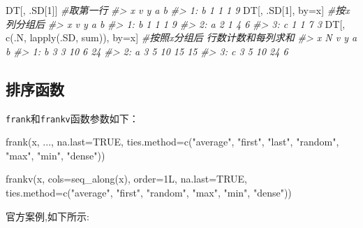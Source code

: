 \documentclass[
]{book}
\newenvironment{Shaded}{\begin{snugshade}}{\end{snugshade}}
\newcommand{\AttributeTok}[1]{\textcolor[rgb]{0.77,0.63,0.00}{#1}}
\newcommand{\CommentTok}[1]{\textcolor[rgb]{0.56,0.35,0.01}{\textit{#1}}}
\newcommand{\ConstantTok}[1]{\textcolor[rgb]{0.00,0.00,0.00}{#1}}
\newcommand{\DecValTok}[1]{\textcolor[rgb]{0.00,0.00,0.81}{#1}}
\newcommand{\FunctionTok}[1]{\textcolor[rgb]{0.00,0.00,0.00}{#1}}
\newcommand{\NormalTok}[1]{#1}
\newcommand{\OtherTok}[1]{\textcolor[rgb]{0.56,0.35,0.01}{#1}}
\newcommand{\StringTok}[1]{\textcolor[rgb]{0.31,0.60,0.02}{#1}}
\begin{document}
\begin{Shaded}
\begin{Highlighting}[]
\NormalTok{DT[, .SD[}\DecValTok{1}\NormalTok{]] }\CommentTok{\#取第一行}
\CommentTok{\#\textgreater{}    x v y a b}
\CommentTok{\#\textgreater{} 1: b 1 1 1 9}
\NormalTok{DT[, .SD[}\DecValTok{1}\NormalTok{], by}\OtherTok{=}\NormalTok{x] }\CommentTok{\#按x列分组后}
\CommentTok{\#\textgreater{}    x v y a b}
\CommentTok{\#\textgreater{} 1: b 1 1 1 9}
\CommentTok{\#\textgreater{} 2: a 2 1 4 6}
\CommentTok{\#\textgreater{} 3: c 1 1 7 3}
\NormalTok{DT[, }\FunctionTok{c}\NormalTok{(.N, }\FunctionTok{lapply}\NormalTok{(.SD, sum)), by}\OtherTok{=}\NormalTok{x] }\CommentTok{\#按照x分组后 行数计数和每列求和}
\CommentTok{\#\textgreater{}    x N v  y  a  b}
\CommentTok{\#\textgreater{} 1: b 3 3 10  6 24}
\CommentTok{\#\textgreater{} 2: a 3 5 10 15 15}
\CommentTok{\#\textgreater{} 3: c 3 5 10 24  6}
\end{Highlighting}
\end{Shaded}

\hypertarget{ux6392ux5e8fux51fdux6570-1}{%
\subsection{排序函数}\label{ux6392ux5e8fux51fdux6570-1}}

\texttt{frank}和\texttt{frankv}函数参数如下：

\begin{Shaded}
\begin{Highlighting}[]
\FunctionTok{frank}\NormalTok{(x, ..., }\AttributeTok{na.last=}\ConstantTok{TRUE}\NormalTok{, }\AttributeTok{ties.method=}\FunctionTok{c}\NormalTok{(}\StringTok{"average"}\NormalTok{,}
  \StringTok{"first"}\NormalTok{, }\StringTok{"last"}\NormalTok{, }\StringTok{"random"}\NormalTok{, }\StringTok{"max"}\NormalTok{, }\StringTok{"min"}\NormalTok{, }\StringTok{"dense"}\NormalTok{))}

\FunctionTok{frankv}\NormalTok{(x, }\AttributeTok{cols=}\FunctionTok{seq\_along}\NormalTok{(x), }\AttributeTok{order=}\NormalTok{1L, }\AttributeTok{na.last=}\ConstantTok{TRUE}\NormalTok{,}
      \AttributeTok{ties.method=}\FunctionTok{c}\NormalTok{(}\StringTok{"average"}\NormalTok{, }\StringTok{"first"}\NormalTok{, }\StringTok{"random"}\NormalTok{,}
        \StringTok{"max"}\NormalTok{, }\StringTok{"min"}\NormalTok{, }\StringTok{"dense"}\NormalTok{))}
\end{Highlighting}
\end{Shaded}

官方案例,如下所示:
\end{document}

